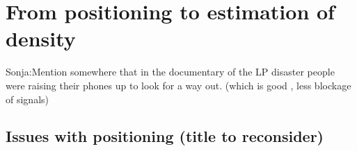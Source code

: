 \documentclass[10pt,a4paper]{article}
\begin{document}

\section{From positioning to estimation of density}



Sonja:Mention somewhere that in the documentary of the LP disaster people were raising their phones up to look for a way out. (which is good , less blockage of signals)
\subsection{Issues with positioning (title to reconsider)}
\end{document}
